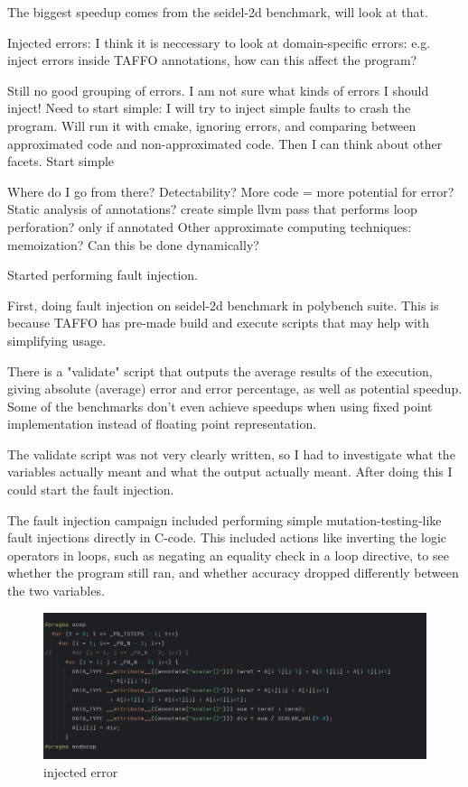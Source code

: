 The biggest speedup comes from the seidel-2d benchmark, will look at that.


Injected errors: I think it is neccessary to look at domain-specific errors: e.g. inject errors inside TAFFO annotations, how can this affect the program? 

Still no good grouping of errors. I am not sure what kinds of errors I should inject! Need to start simple:
I will try to inject simple faults to crash the program. Will run it with cmake, ignoring errors, and comparing between approximated code and non-approximated code. 
Then I can think about other facets. Start simple

Where do I go from there? Detectability? 
More code = more potential for error?
Static analysis of annotations?
create simple llvm pass that performs loop perforation? only if annotated  
    Other approximate computing techniques:
    memoization? Can this be done dynamically?

Started performing fault injection.

First, doing fault injection on seidel-2d benchmark in polybench suite. This is because TAFFO has pre-made build and execute scripts that may help with simplifying usage. 

There is a "validate" script that outputs the average results of the execution, giving absolute (average) error and error percentage, as well as potential speedup. Some of the benchmarks don't even achieve speedups when using fixed point implementation instead of floating point representation.

The validate script was not very clearly written, so I had to investigate what the variables actually meant and what the output actually meant. After doing this I could start the fault injection.

The fault injection campaign included performing simple mutation-testing-like fault injections directly in C-code. This included actions like inverting the logic operators in loops, such as negating an equality check in a loop directive, to see whether the program still ran, and whether accuracy dropped differently between the two variables.
\begin{figure}
    \centering
    \includegraphics[width=0.5\linewidth]{Images/injected_basic_error.png}
    \caption{injected error}
    \label{fig:enter-label}
\end{figure}

